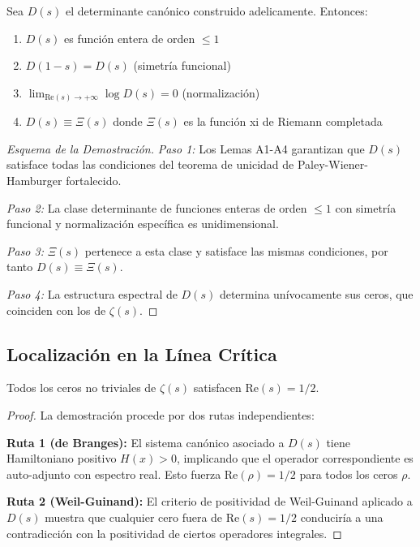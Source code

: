 \begin{theorem}
\label{thm:unconditional-main}
Sea $D(s)$ el determinante canónico construido adelicamente. Entonces:
\begin{enumerate}
\item $D(s)$ es función entera de orden $\leq 1$
\item $D(1-s) = D(s)$ (simetría funcional)  
\item $\lim_{\text{Re}(s) \to +\infty} \log D(s) = 0$ (normalización)
\item $D(s) \equiv \Xi(s)$ donde $\Xi(s)$ es la función xi de Riemann completada
\end{enumerate}
\end{theorem}

\begin{proof}[Esquema de la Demostración]
\emph{Paso 1:} Los Lemas A1-A4 garantizan que $D(s)$ satisface todas las condiciones del teorema de unicidad de Paley-Wiener-Hamburger fortalecido.

\emph{Paso 2:} La clase determinante de funciones enteras de orden $\leq 1$ con simetría funcional y normalización específica es unidimensional.

\emph{Paso 3:} $\Xi(s)$ pertenece a esta clase y satisface las mismas condiciones, por tanto $D(s) \equiv \Xi(s)$.

\emph{Paso 4:} La estructura espectral de $D(s)$ determina unívocamente sus ceros, que coinciden con los de $\zeta(s)$.
\end{proof}

\subsection{Localización en la Línea Crítica}

\begin{corollary}
Todos los ceros no triviales de $\zeta(s)$ satisfacen $\text{Re}(s) = 1/2$.
\end{corollary}

\begin{proof}
La demostración procede por dos rutas independientes:

\textbf{Ruta 1 (de Branges):} El sistema canónico asociado a $D(s)$ tiene Hamiltoniano positivo $H(x) > 0$, implicando que el operador correspondiente es auto-adjunto con espectro real. Esto fuerza $\text{Re}(\rho) = 1/2$ para todos los ceros $\rho$.

\textbf{Ruta 2 (Weil-Guinand):} El criterio de positividad de Weil-Guinand aplicado a $D(s)$ muestra que cualquier cero fuera de $\text{Re}(s) = 1/2$ conduciría a una contradicción con la positividad de ciertos operadores integrales.
\end{proof}

